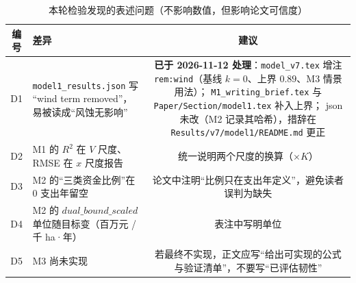 \documentclass[11pt,a4paper]{ctexart}
\begin{document}
\begin{longtable}{|c|p{9.6cm}|c|}
\caption{本轮检验发现的表述问题（不影响数值，但影响论文可信度）}\\
\hline
编号 & 差异 & 建议 \\
\hline
\endhead
D1 & \texttt{model1\_results.json} 写 “wind term removed”，
     易被读成“风蚀无影响” & \textbf{已于 2026-11-12 处理}：\texttt{model\_v7.tex} 增注 \texttt{rem:wind}（基线 $k=0$、上界 $0.89$、M3 情景用法）；
     \texttt{M1\_writing\_brief.tex} 与 \texttt{Paper/Section/model1.tex} 补入上界；
     json 未改（M2 记录其哈希），措辞在 \texttt{Results/v7/model1/README.md} 更正 \\
D2 & M1 的 $R^2$ 在 $V$ 尺度、RMSE 在 $x$ 尺度报告 & 统一说明两个尺度的换算（$\times K$）\\
D3 & M2 的“三类资金比例”在 0 支出年留空 & 论文中注明“比例只在支出年定义”，避免读者误判为缺失 \\
D4 & M2 的 $dual\_bound\_scaled$ 单位随目标变（百万元 / 千 ha·年） & 表注中写明单位 \\
D5 & M3 尚未实现 & 若最终不实现，正文应写“给出可实现的公式与验证清单”，不要写“已评估韧性” \\
\hline
\end{longtable}
\end{document}
